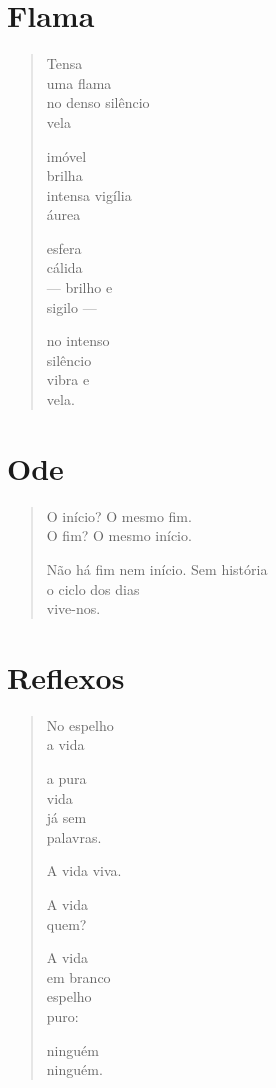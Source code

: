\chapter{Flama}

\begin{verse}
Tensa\\
uma flama\\
no denso silêncio\\
\qquad\qquad\quad vela

imóvel\\
brilha\\
intensa vigília\\
\qquad\qquad áurea

esfera\\
cálida\\
--- brilho e\\
\qquad sigilo ---

no intenso\\
silêncio\\
vibra e\\
\qquad vela.
\end{verse}

\chapter{Ode}

\begin{verse}
O início? O mesmo fim.\\
O fim? O mesmo início.

Não há fim nem início. Sem história\\
o ciclo dos dias\\
vive-nos.
\end{verse}

\chapter{Reflexos}

\begin{verse}
No espelho\\
a vida

a pura\\
vida\\
já sem\\
palavras.

A vida viva.

A vida\\
quem?

A vida\\
em branco\\
espelho\\
puro:

ninguém\\
ninguém.
\end{verse}

